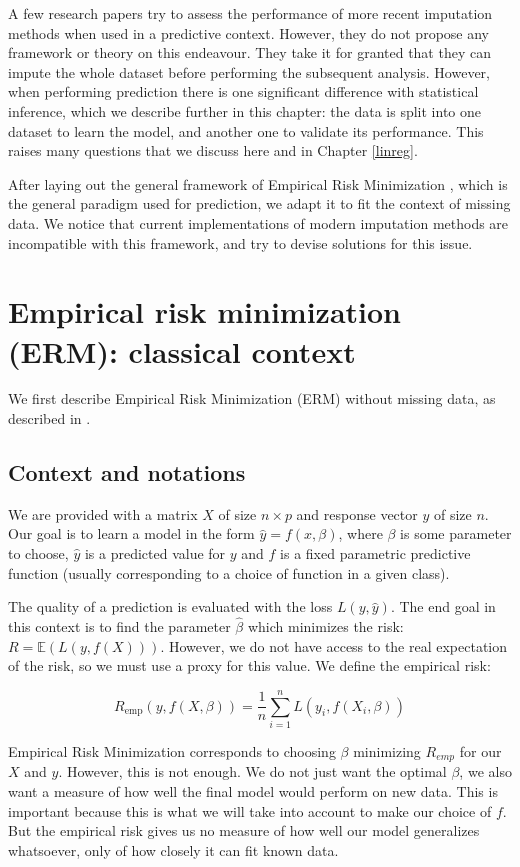 \documentclass[12pt, a4paper]{memoir}
\begin{document}
A few research papers \cite{prediction_imputation1} \cite{prediction_imputation2} try to assess the performance of more recent imputation methods when used in a predictive context. However, they do not propose any framework or theory on this endeavour. They take it for granted that they can impute the whole dataset before performing the subsequent analysis. However, when performing prediction there is one significant difference with statistical inference, which we describe further in this chapter: the data is split into one dataset to learn the model, and another one to validate its performance. This raises many questions that we discuss here and in Chapter \ref{linreg}. 

After laying out the general framework of Empirical Risk Minimization \cite{ERM}, which is the general paradigm used for prediction, we adapt it to fit the context of missing data. We notice that current implementations of modern imputation methods are incompatible with this framework, and try to devise solutions for this issue.
	\section{Empirical risk minimization (ERM): classical context}
We first describe Empirical Risk Minimization (ERM) without missing data, as described in \cite{ERM}.
		\subsection{Context and notations}
We are provided with a matrix $X$ of size $n \times p$ and response vector $y$ of size $n$. Our goal is to learn a model in the form $\hat{y} = f(x, \beta)$, where $\beta$ is some parameter to choose, $\hat{y}$ is a predicted value for $y$ and $f$ is a fixed parametric predictive function (usually corresponding to a choice of function in a given class).

The quality of a prediction is evaluated with the loss $L(y,\hat{y})$. The end goal in this context is to find the parameter $\hat{\beta}$ which minimizes the risk: $R = \mathbb{E}(L(y, f(X)))$. However, we do not have access to the real expectation of the risk, so we must use a proxy for this value. We define the empirical risk:

$$ R_{\text{emp}}(y, f(X, \beta)) = \frac{1}{n} \sum\limits_{i=1}^n L(y_i, f(X_i, \beta))$$

Empirical Risk Minimization corresponds to choosing $\beta$ minimizing $R_{emp}$ for our $X$ and $y$. However, this is not enough. We do not just want the optimal $\beta$, we also want a measure of how well the final model would perform on new data. This is important because this is what we will take into account to make our choice of $f$. But the empirical risk gives us no measure of how well our model generalizes whatsoever, only of how closely it can fit known data.
\end{document}
